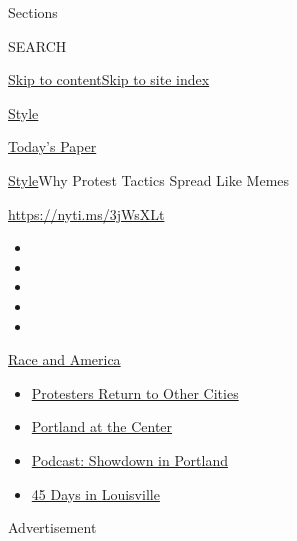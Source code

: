 Sections

SEARCH

\protect\hyperlink{site-content}{Skip to
content}\protect\hyperlink{site-index}{Skip to site index}

\href{https://www.nytimes.com/section/style}{Style}

\href{https://myaccount.nytimes.com/auth/login?response_type=cookie\&client_id=vi}{}

\href{https://www.nytimes.com/section/todayspaper}{Today's Paper}

\href{/section/style}{Style}\textbar{}Why Protest Tactics Spread Like
Memes

\url{https://nyti.ms/3jWsXLt}

\begin{itemize}
\item
\item
\item
\item
\item
\end{itemize}

\href{https://www.nytimes.com/news-event/george-floyd-protests-minneapolis-new-york-los-angeles?action=click\&pgtype=Article\&state=default\&region=TOP_BANNER\&context=storylines_menu}{Race
and America}

\begin{itemize}
\tightlist
\item
  \href{https://www.nytimes.com/2020/07/26/us/protests-portland-seattle-trump.html?action=click\&pgtype=Article\&state=default\&region=TOP_BANNER\&context=storylines_menu}{Protesters
  Return to Other Cities}
\item
  \href{https://www.nytimes.com/2020/07/24/us/portland-oregon-protests-white-race.html?action=click\&pgtype=Article\&state=default\&region=TOP_BANNER\&context=storylines_menu}{Portland
  at the Center}
\item
  \href{https://www.nytimes.com/2020/07/23/podcasts/the-daily/portland-protests.html?action=click\&pgtype=Article\&state=default\&region=TOP_BANNER\&context=storylines_menu}{Podcast:
  Showdown in Portland}
\item
  \href{https://www.nytimes.com/interactive/2020/07/16/us/black-lives-matter-protests-louisville-breonna-taylor.html?action=click\&pgtype=Article\&state=default\&region=TOP_BANNER\&context=storylines_menu}{45
  Days in Louisville}
\end{itemize}

Advertisement


